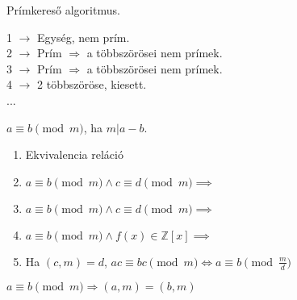 \begin{frame}
  \begin{tcolorbox}[title={Def.: Erathosztenész Szitája}]
    Prímkereső algoritmus.\\
    \mbigskip

    1 $\rightarrow$ Egység, nem prím.\\
    2 $\rightarrow$ Prím $\Rightarrow$ a többszörösei nem prímek.\\
    3 $\rightarrow$ Prím $\Rightarrow$ a többszörösei nem prímek.\\
    4 $\rightarrow$ 2 többszöröse, kiesett.\\
    ...
  \end{tcolorbox}
\end{frame}

\begin{frame}
  \begin{tcolorbox}[title={Def.: Lineáris Kongruencia}]
    $a \equiv b \pmod{m}$, ha $m | a - b$.
  \end{tcolorbox}

  \begin{tcolorbox}[title={Tétel: Kongruencia tulajdonságai}]
    \begin{enumerate}
      \item Ekvivalencia reláció
      \item $a \equiv b \pmod{m} \land c \equiv d \pmod{m} \implies$ 
      \item $a \equiv b \pmod{m} \land c \equiv d \pmod{m} \implies$ 
      \item $a \equiv b \pmod{m} \land f(x) \in \mathbb{Z}[x] \implies$ 
      \item Ha $(c, m) = d$, $ac \equiv bc \pmod{m} \iff a \equiv b \pmod{\frac{m}{d}}$
    \end{enumerate}
  \end{tcolorbox}

  \begin{tcolorbox}[title={Ész}]
    $a \equiv b \pmod{m} \Rightarrow (a, m) = (b, m)$
  \end{tcolorbox}
\end{frame}


